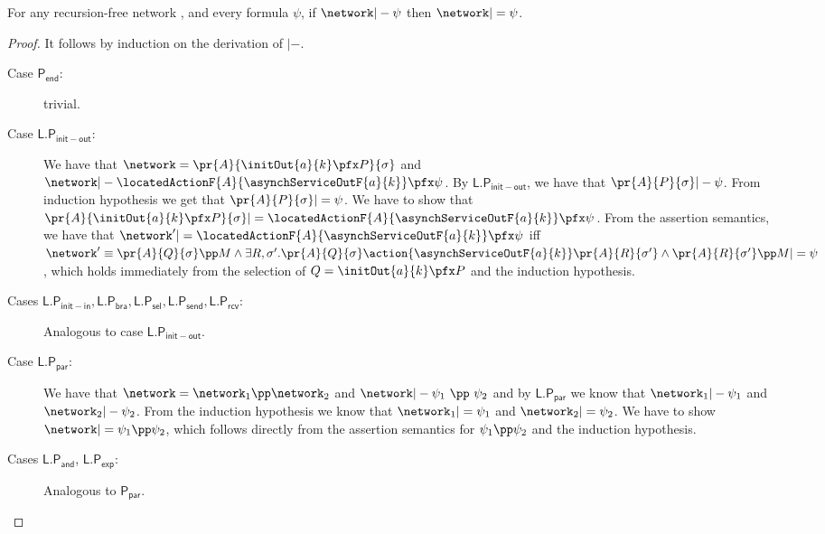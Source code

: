 \begin{theorem}[Soundness]\label{Logic4Struct:thm:LL:soundness}
  For any 
  recursion-free network \network, and every formula $\psi$, if $
  \network |- \psi$  then $ \network |= \psi$.
\end{theorem}
\begin{proof}
  It follows by induction on the derivation of $|-$.
 \begin{description}

  \item[Case $\mathsf{P_{end}}$:] trivial.

  \item[Case $\mathsf{L.P_{init-out}}$:] We have that $\network =
    \pr{A}{\initOut{a}{k} \pfx P}{\sigma} $ and $\network |-
    \locatedActionF{A}{ \asynchServiceOutF{a}{k}} \pfx \psi$. By
    $\mathsf{L.P_{init-out}}$, we have that $\pr{A}{P}{\sigma} |-
    \psi$. From induction hypothesis we get that $\pr{A}{P}{\sigma} |=
    \psi$. We have to show that  $\pr{A}{\initOut{a}{k} \pfx
      P}{\sigma}   |= \locatedActionF{A}{ \asynchServiceOutF{a}{k}}
    \pfx \psi$. From the assertion semantics, we have that $\network' |=
    \locatedActionF{A}{\asynchServiceOutF{a}{k}} \pfx \psi$ iff
    $\network' \equiv \pr{A}{Q}{\sigma} \pp M \land \exists
    R,\sigma'. \pr{A}{Q}{\sigma} \action{\asynchServiceOutF{a}{k}}
    \pr{A}{R}{\sigma'} \land \pr{A}{R}{\sigma'} \pp M |= \psi$, which
    holds immediately from the selection of $Q = \initOut{a}{k} \pfx P$
    and the induction hypothesis.

    \item[Cases $\mathsf{L.P_{init-in}}, \mathsf{L.P_{bra}},
      \mathsf{L.P_{sel}}, \mathsf{L.P_{send}}, \mathsf{L.P_{rcv}}$:]
      Analogous to case $\mathsf{L.P_{init-out}}$.

  \item[Case $\mathsf{L.P_{par}}$:] We have that $\network  =
    \network_1 \pp \network_2$ and $\network |- \psi_1
    ~\pp~ \psi_2$ and by $\mathsf{L.P_{par}}$ we know that $\network_1
    |- \psi_1$ and $\network_2 |- \psi_2$. From the induction
    hypothesis we know that $\network_1 |= \psi_1$ and $\network_2 |=
    \psi_2$. We have to show $\network |= \psi_1 \pp \psi_2$, which
    follows directly from the assertion semantics for $\psi_1 \pp
    \psi_2$ and the induction hypothesis.

    \item[Cases $\mathsf{L.P_{and}}$, $\mathsf{L.P_{exp}}$:] Analogous to
      $\mathsf{P_{par}}$.



\end{description}
\end{proof}
